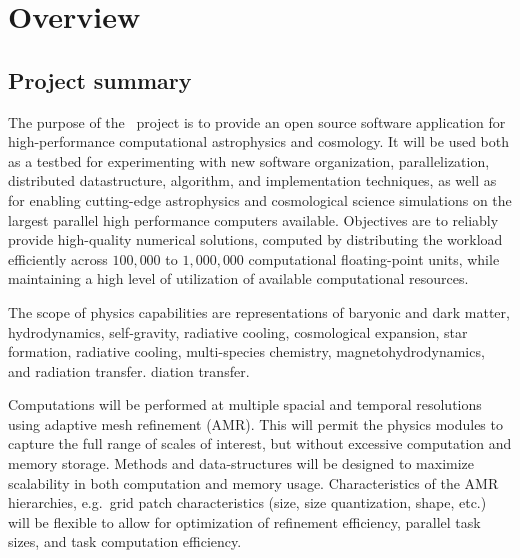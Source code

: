 \documentclass{article}[12pt]
\begin{document}

\section{Overview} \label{s:overview}

\subsection{Project summary}

The purpose of the \cello\ project is to provide an open source
software application for high-performance computational astrophysics
and cosmology.  It will be used both as a testbed for experimenting
with new software organization, parallelization, distributed
datastructure, algorithm, and implementation techniques, as well as
for enabling cutting-edge astrophysics and cosmological science
simulations on the largest parallel high performance computers
available.  Objectives are to reliably provide high-quality numerical
solutions, computed by distributing the workload efficiently across
$100,000$ to $1,000,000$ computational floating-point units, while
maintaining a high level of utilization of available computational
resources.

The scope of physics capabilities are representations of baryonic and
dark matter, hydrodynamics, self-gravity, radiative cooling,
cosmological expansion, star formation, radiative cooling,
multi-species chemistry, magnetohydrodynamics, and radiation transfer.
diation transfer.

  Computations will be performed at multiple spacial
   and temporal resolutions using adaptive mesh refinement (AMR).
   This will permit the physics modules to capture the full range of
   scales of interest, but without excessive computation and memory
   storage.  Methods and data-structures will be designed to maximize
   scalability in both computation and memory usage.  Characteristics
   of the AMR hierarchies, e.g.~grid patch characteristics (size, size
   quantization, shape, etc.) will be flexible to allow for
   optimization of refinement efficiency, parallel task sizes, and
   task computation efficiency.
\end{document}
